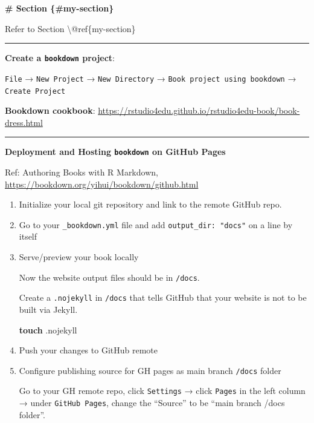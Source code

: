 \documentclass[
  a4paper,
  twoside,
  openright]{book}
\newenvironment{Shaded}{\begin{snugshade}}{\end{snugshade}}
\newcommand{\FunctionTok}[1]{\textcolor[rgb]{0.13,0.29,0.53}{\textbf{#1}}}
\newcommand{\NormalTok}[1]{#1}
\theoremstyle{definition}
\theoremstyle{definition}
\theoremstyle{definition}
\theoremstyle{definition}
\theoremstyle{remark}
\begin{document}
\begin{Shaded}
\begin{Highlighting}[]
\FunctionTok{\# Section \{\#my{-}section\}}

\NormalTok{Refer to Section \textbackslash{}@ref\{my{-}section\}}
\end{Highlighting}
\end{Shaded}

\begin{center}\rule{0.5\linewidth}{0.5pt}\end{center}

\textbf{Create a \texttt{bookdown} project}:

\texttt{File} → \texttt{New\ Project} → \texttt{New\ Directory} → \texttt{Book\ project\ using\ bookdown} → \texttt{Create\ Project}

\textbf{Bookdown cookbook}: \url{https://rstudio4edu.github.io/rstudio4edu-book/book-dress.html}

\begin{center}\rule{0.5\linewidth}{0.5pt}\end{center}

\textbf{Deployment and Hosting \texttt{bookdown} on GitHub Pages}

Ref: Authoring Books with R Markdown, \url{https://bookdown.org/yihui/bookdown/github.html}

\begin{enumerate}
\def\labelenumi{\arabic{enumi}.}
\item
  Initialize your local git repository and link to the remote GitHub repo.
\item
  Go to your \texttt{\_bookdown.yml} file and add \texttt{output\_dir:\ "docs"} on a line by itself
\item
  Serve/preview your book locally

  Now the website output files should be in \texttt{/docs}.

  Create a \texttt{.nojekyll} in \texttt{/docs} that tells GitHub that your website is not to be built via Jekyll.

\begin{Shaded}
\begin{Highlighting}[]
\FunctionTok{touch}\NormalTok{ .nojekyll}
\end{Highlighting}
\end{Shaded}
\item
  Push your changes to GitHub remote
\item
  Configure publishing source for GH pages as main branch \texttt{/docs} folder

  Go to your GH remote repo, click \texttt{Settings} → click \texttt{Pages} in the left column → under \texttt{GitHub\ Pages}, change the ``Source'' to be ``main branch /docs folder''.
\end{enumerate}
\end{document}
